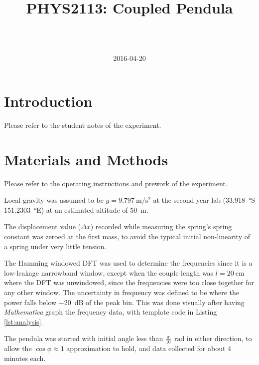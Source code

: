 \documentclass[a4paper]{scrartcl}
\begin{document}
\title{PHYS2113: Coupled Pendula}
\author{ \\ \\ }
\date{2016-04-20}
\maketitle

\section{Introduction}
Please refer to the student notes of the experiment.

\section{Materials and Methods}
Please refer to the operating instructions and prework of the experiment.

Local gravity was assumed to be \(g = \SI{9.797}{\metre\per\second\squared}\) \cite{BGI2016} at the second year lab (\SI{33.918}{\degree}S \SI{151.2303}{\degree}E) at an estimated altitude of \SI{50}{\metre}.

The displacement value (\(\Delta x\)) recorded while measuring the spring's spring constant was zeroed at the first mass, to avoid the typical initial non-linearity of a spring under very little tension.

The Hamming windowed DFT was used to determine the frequencies since it is a low-leakage narrowband window, except when the couple length was \(l = \SI{20}{\centi\metre}\) where the DFT was unwindowed, since the frequencies were too close together for any other window. The uncertainty in frequency was defined to be where the power falls below \SI{-20}{\deci\bel} of the peak bin. This was done visually after having \emph{Mathematica} graph the frequency data, with template code in Listing \ref{lst:analysis}.

The pendula was started with initial angle less than \(\frac{\pi}{10} \:\SI{}{\radian}\) in either direction, to allow the \(\cos \phi \approx 1\) approximation to hold, and data collected for about 4 minutes each.
\end{document}
